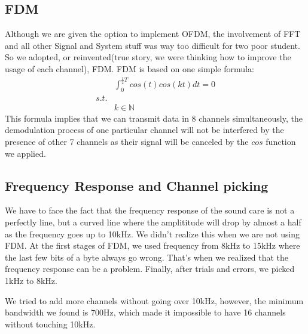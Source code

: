 \documentclass[conference,compsoc]{IEEEtran}
\begin{document}
	\subsection{FDM}
		Although we are given the option to implement OFDM, the involvement of FFT and all other Signal and System stuff was way too difficult for two poor student. 
		So we adopted, or reinvented(true story, we were thinking how to improve the usage of each channel), FDM.
		FDM is based on one simple formula:
		\begin{equation*} \begin{aligned}
			& \int_{0}^{\frac{1}{2}T} cos(t)cos(kt)dt = 0 \\
			s.t. \\
			& k \in \mathbb{N}
		\end{aligned} \end{equation*}
		This formula implies that we can transmit data in 8 channels simultaneously, the demodulation process of one particular channel will not be interfered by the presence of other 7 channels as their signal will be canceled by the $cos$ function we applied.
	
	\subsection{Frequency Response and Channel picking}
		We have to face the fact that the frequency response of the sound care is not a perfectly line, but a curved line where the amplititude will drop by almost a half as the frequency goes up to 10kHz.
		We didn't realize this when we are not using FDM. 
		At the first stages of FDM, we used frequency from 8kHz to 15kHz where the last few bits of a byte always go wrong. 
		That's when we realized that the frequency response can be a problem.
		Finally, after trials and errors, we picked 1kHz to 8kHz.
		\par
		We tried to add more channels without going over 10kHz, however, the minimum bandwidth we found is 700Hz, which made it impossible to have 16 channels without touching 10kHz.
\end{document}
